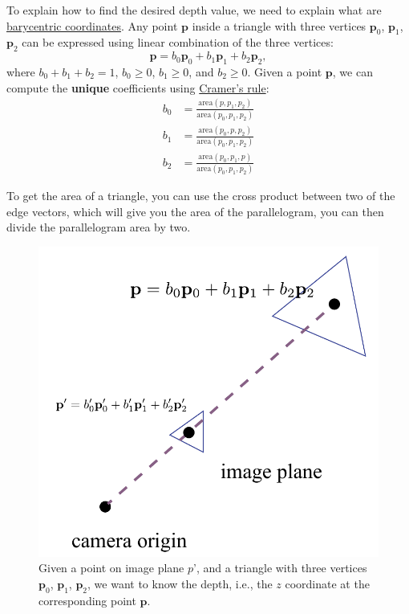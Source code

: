 To explain how to find the desired depth value, we need to explain what are \href{https://en.wikipedia.org/wiki/Barycentric_coordinate_system}{barycentric coordinates}. Any point $\mathbf{p}$ inside a triangle with three vertices $\mathbf{p}_0$, $\mathbf{p}_1$, $\mathbf{p}_2$ can be expressed using linear combination of the three vertices:
\begin{equation}
\mathbf{p} = b_0 \mathbf{p}_0 + b_1 \mathbf{p}_1 + b_2 \mathbf{p}_2,
\end{equation}
where $b_0 + b_1 + b_2 = 1$, $b_0 \geq 0$, $b_1 \geq 0$, and $b_2 \geq 0$. Given a point $\mathbf{p}$, we can compute the \textbf{unique} coefficients using \href{https://en.wikipedia.org/wiki/Cramer%27s_rule}{Cramer's rule}:
\begin{equation}
\begin{aligned}
b_0 &= \frac{\text{area}\left(p, p_1, p_2\right)}{\text{area}\left(p_0, p_1, p_2\right)} \\
b_1 &= \frac{\text{area}\left(p_0, p, p_2\right)}{\text{area}\left(p_0, p_1, p_2\right)} \\
b_2 &= \frac{\text{area}\left(p_0, p_1, p\right)}{\text{area}\left(p_0, p_1, p_2\right)}
\end{aligned}
\label{eq:barycentric_solve}
\end{equation}

To get the area of a triangle, you can use the cross product between two of the edge vectors, which will give you the area of the parallelogram, you can then divide the parallelogram area by two.

\begin{figure}[h]
    \centering
    \includegraphics[width=0.5\linewidth]{imgs/perspective_interpolate.pdf}
    \caption{Given a point on image plane $p$', and a triangle with three vertices $\mathbf{p}_0$, $\mathbf{p}_1$, $\mathbf{p}_2$, we want to know the depth, i.e., the $z$ coordinate at the corresponding point $\mathbf{p}$.}
    \label{fig:perspective_interpolate}
\end{figure}

